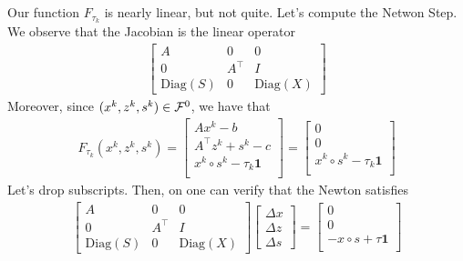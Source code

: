 \subsection{}
	Our function $F_{\tau_k}$ is nearly linear, but not quite. Let's compute the Netwon Step. We observe that the Jacobian is the linear operator
	\begin{eqnarray}
	\begin{bmatrix}
	A & 0 & 0 \\
	0 & A^\top & I \\
	\mathrm{Diag}(S) & 0 & \mathrm{Diag}(X)
	\end{bmatrix}
	\end{eqnarray}
	Moreover, since $(x^k,z^k,s^k) \in {\cal F}^0$, we have that
	\begin{eqnarray}
	F_{\tau_k}(x^k,z^k,s^k) = \begin{bmatrix} Ax^k - b \\
		A^\top z^k + s^k - c \\
		x^k \circ s^k - \tau_{k} \mathbf{1} \\
		\end{bmatrix} = \begin{bmatrix} 0 \\
		0 \\
		x^k \circ s^k - \tau_{k} \mathbf{1} \\
		\end{bmatrix}
	\end{eqnarray}
	Let's drop subscripts. Then, on one can verify that the Newton satisfies
	\begin{eqnarray}
	\begin{bmatrix}
	A & 0 & 0 \\
	0 & A^\top & I \\
	\mathrm{Diag}(S) & 0 & \mathrm{Diag}(X)
	\end{bmatrix} \begin{bmatrix} \Delta x\\
	\Delta z\\
	\Delta s
	\end{bmatrix} = \begin{bmatrix} 0 \\
	0 \\
	- x \circ s + \tau \mathbf{1} \\
	\end{bmatrix}
	\end{eqnarray}

